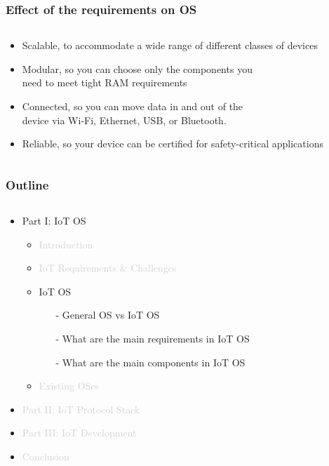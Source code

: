 \documentclass{beamer}
\begin{document}
\begin{frame}
	\frametitle{Effect of the requirements on OS}
	\begin{columns}[c]
		\begin{column}{30cm}
			\vspace{.1cm}
			\begin{itemize}
				\justifying
				\item \textcolor{TextOrange}{Scalable}, to accommodate a wide range of different
				 classes of devices
				\item \textcolor{TextGreen}{Modular}, so you can choose only the components you\\
				need to meet tight RAM requirements
				\item \textcolor{TextOrange}{Connected}, so you can move data in and out of the\\
				device via Wi-Fi, Ethernet, USB, or Bluetooth.
				\item \textcolor{TextGreen}{Reliable}, so your device can be certified for safety-critical
				applications
			\end{itemize}
		\end{column}
	\end{columns}
\end{frame}
\fi
\begin{frame}
	\frametitle{Outline}
	\begin{columns}[c]
		\begin{column}{30cm}
			\vspace{.1cm}
			\begin{itemize}
				\justifying
				\item Part I: IoT OS
				\begin{itemize}
					\item \textcolor{LightGray}{Introduction}
					\item \textcolor{LightGray}{IoT Requirements \& Challenges}
					\item {IoT OS}
					\begin{itemize}
						\item[-] General OS vs IoT OS
						\item[-] What are the main requirements in IoT OS
						\item[-] What are the main components in IoT OS
				\end{itemize}
					\item \textcolor{LightGray}{Existing OSes}
				\end{itemize}
				\item \textcolor{LightGray}{Part II: IoT Protocol Stack}
				\item \textcolor{LightGray}{Part III: IoT Development}
				\item \textcolor{LightGray}{Conclusion}
			\end{itemize}
		\end{column}
	\end{columns}
\end{frame}
\end{document}
